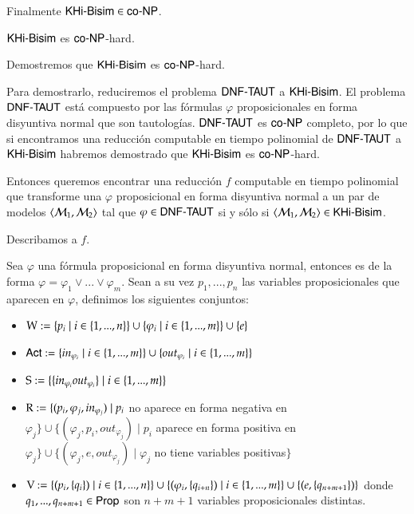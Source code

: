 \begin{demostracion}
    


    Finalmente $\KHiBisim \in \coNP$.

\end{demostracion}

\begin{lema}
    $\KHiBisim$ es $\coNP$-hard.
\end{lema}

\begin{demostracion}

    Demostremos que $\KHiBisim$ es $\coNP$-hard.

    Para demostrarlo, reduciremos el problema $\DNFTAUT$ a $\KHiBisim$. El problema $\DNFTAUT$ está compuesto por las fórmulas $\varphi$ proposicionales en forma disyuntiva normal que son tautologías. $\DNFTAUT$ es $\coNP$ completo, por lo que si encontramos una reducción computable en tiempo polinomial de $\DNFTAUT$ a $\KHiBisim$ habremos demostrado que $\KHiBisim$ es $\coNP$-hard.

    Entonces queremos encontrar una reducción $f$ computable en tiempo polinomial que transforme una $\varphi$ proposicional en forma disyuntiva normal a un par de modelos $\tup{\modults_1,\modults_2}$ tal que $\varphi \in \DNFTAUT$ si y sólo si $\tup{\modults_1,\modults_2} \in \KHiBisim$.

    Describamos a $f$.

    Sea $\varphi$ una fórmula proposicional en forma disyuntiva normal, entonces es de la forma $\varphi = \varphi_1 \vee ... \vee \varphi_m$. Sean a su vez $p_1,...,p_n$ las variables proposicionales que aparecen en $\varphi$, definimos los siguientes conjuntos:

    \begin{itemize}
        \item $\W := \{p_i\mid i\in\{1,...,n\}\} \cup \{\varphi_i \mid i \in \{1,...,m\}\} \cup \{e\}$
        \item $\ACT := \{in_{\varphi_i} \mid i \in \{1,...,m\}\} \cup \{out_{\varphi_i} \mid i \in \{1,...,m\}\}$
        \item $\S := \{\{in_{\varphi_i}out_{\varphi_i}\} \mid i \in \{1,...,m\}\}$
        \item $\R := \{(p_i,\varphi_j,in_{\varphi_j}) \mid p_i$ no aparece en forma negativa en $\varphi_j\} \cup \{(\varphi_j,p_i,out_{\varphi_j})\mid p_i$ aparece en forma positiva en $\varphi_j\} \cup \{(\varphi_j,e,out_{\varphi_j}) \mid \varphi_j$ no tiene variables positivas$\}$
        \item $\V := \{(p_i,\{q_i\}) \mid i \in \{1,...,n\}\} \cup \{(\varphi_i,\{q_{i+n}\}) \mid i \in \{1,...,m\}\} \cup \{(e,\{q_{n+m+1}\})\}$ donde $q_1,...,q_{n+m+1} \in \PROP$ son $n+m+1$ variables proposicionales distintas.
    \end{itemize}


\end{demostracion}
